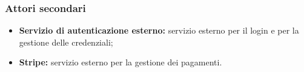 \begin{itemize}
\begin{itemize}
\begin{figure}[!ht]
                            \centering
                        \end{figure}
                \end{itemize}
        \end{itemize}
        \subsubsection{Attori secondari}
        \begin{itemize}
            \item \textbf{Servizio di autenticazione esterno:} servizio esterno per il login e per la gestione delle credenziali;
            \item \textbf{Stripe:} servizio esterno per la gestione dei pagamenti.
        \end{itemize}
        \newpage

